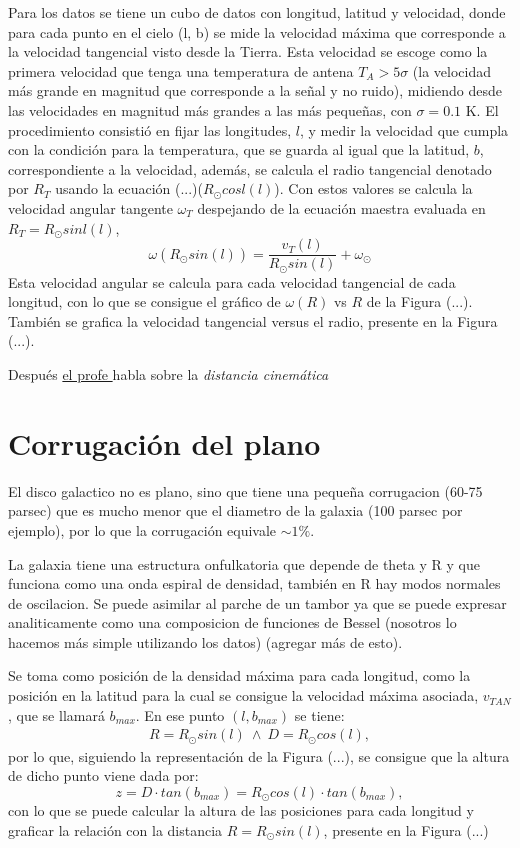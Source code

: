 \documentclass[letterpaper,oneside]{article}
\begin{document}
Para los datos se tiene un cubo de datos con longitud, latitud y velocidad, donde para cada punto en el cielo (l, b) se mide la velocidad máxima que corresponde a la velocidad tangencial visto desde la Tierra. Esta velocidad se escoge como la primera velocidad que tenga una temperatura de antena $T_A>5\sigma$ (la velocidad más grande en magnitud que corresponde a la señal y no ruido), midiendo desde las velocidades en magnitud más grandes a las más pequeñas, con $\sigma =0.1$ \si{\kelvin}. El procedimiento consistió en fijar las longitudes, $l$, y medir la velocidad que cumpla con la condición para la temperatura, que se guarda al igual que la latitud, $b$, correspondiente a la velocidad, además, se calcula el radio tangencial denotado por $R_T$ usando la ecuación (...)($R_{\odot}cosl(l)$). Con estos valores se calcula la velocidad angular tangente $\omega_T$ despejando de la ecuación maestra evaluada en $R_T=R_{\odot}sinl(l)$,
\begin{equation*}
\omega(R_{\odot}sin(l))=\frac{v_T(l)}{R_{\odot}sin(l)}+\omega_{\odot}
\end{equation*}
Esta velocidad angular se calcula para cada velocidad tangencial de cada longitud, con lo que se consigue el gráfico de $\omega(R)$ vs $R$ de la Figura (...). También se grafica la velocidad tangencial versus el radio, presente en la Figura (...).

Después \href{https://www.youtube.com/watch?v=8ISCwe7OM-8}{el profe }habla sobre la \textit{distancia cinemática}
\section{Corrugación del plano}
El disco galactico no es plano, sino que tiene una pequeña corrugacion (60-75 parsec) que es mucho menor que el diametro de la galaxia (100 parsec por ejemplo), por lo que la corrugación equivale $\sim 1\%$.

La galaxia tiene una estructura onfulkatoria que depende de theta y R y que funciona como una onda espiral de densidad, también en R hay modos normales de oscilacion. Se puede asimilar al parche de un tambor ya que se puede expresar analiticamente como una composicion de funciones de Bessel (nosotros lo hacemos más simple utilizando los datos) (agregar más de esto).

Se toma como posición de la densidad máxima para cada longitud, como la posición en la latitud para la cual se consigue la velocidad máxima asociada, $v_{TAN}$, que se llamará $b_{max}$. En ese punto $(l,b_{max})$ se tiene:
\begin{gather*}
R=R_{\odot}sin(l) \ \land \ D=R_{\odot}cos(l),
\end{gather*}
por lo que, siguiendo la representación de la Figura (...), se consigue que la altura de dicho punto viene dada por:
\begin{equation*}
z=D\cdot tan(b_{max})=R_{\odot}cos(l)\cdot tan(b_{max}),
\end{equation*}
con lo que se puede calcular la altura de las posiciones para cada longitud y graficar la relación con la distancia $R=R_{\odot}sin(l)$, presente en la Figura (...)
\end{document}

